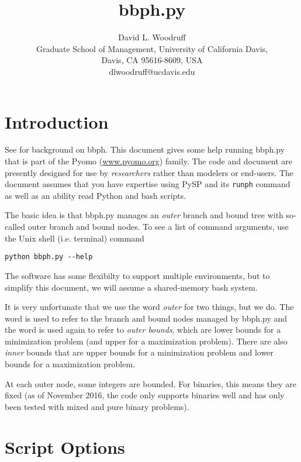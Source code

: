 \documentclass[12pt]{article}
\begin{document}

\title{bbph.py}

\author{David L. Woodruff \\ Graduate School of Management, University of California Davis, \\ Davis, CA 95616-8609, USA \\ dlwoodruff@ucdavis.edu}
\maketitle

\section{Introduction}

See \cite{bbphpaper} for
background on bbph.
This document gives some help running bbph.py
that is part of the Pyomo (\url{www.pyomo.org}) family.
The code and document are presently designed for
use by {\em researchers} rather than modelers or
end-users.
The document assumes that you have expertise using PySP \cite{pyspmpc}
and its \verb|runph| command as well as an ability read Python and bash scripts.

The basic idea is that bbph.py manages an {\em outer} branch and bound tree with so-called outer branch and bound nodes.
To see a list of command arguments, use the Unix shell (i.e. terminal) command
\begin{verbatim}
python bbph.py --help
\end{verbatim}
The software has some flexibilty to support multiple environments, but to
simplify this document, we will assume a shared-memory bash system.

It is very unfortunate that we use the word {\em outer} for two
things, but we do. The word is used to refer to the branch and bound
nodes managed by bbph.py and the word is used again to refer to {\em
  outer bounds}, which are lower bounds for a minimization problem
(and upper for a maximization problem). There are also {\em inner}
bounds that are upper bounds for a minimization problem and
lower bounds for a maximization problem.

At each outer node, some integers are bounded. For binaries, this means they
are fixed (as of November 2016, the code only supports binaries well
and has only been tested with mixed and pure binary problems).

\section{Script Options}
\end{document}
